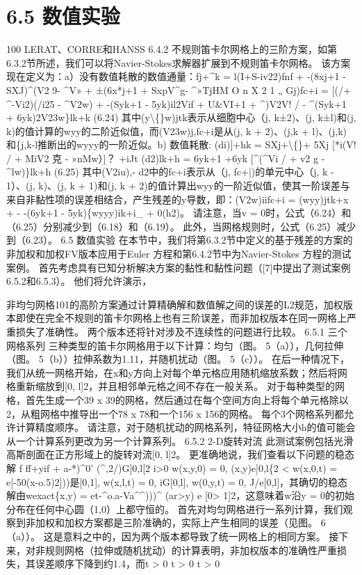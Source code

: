 \documentclass[UTF8,11pt,a4paper,openany,fontset=fandol]{ctexbook}
\begin{document}
\section{6.5 数值实验}
100 LERAT、CORRE和HANSS 6.4.2 不规则笛卡尔网格上的三阶方案，如第6.3.2节所述，我们可以将Navier-Stokes求解器扩展到不规则笛卡尔网格。 该方案现在定义为：a）没有数值耗散的数值通量：fj+\textasciicircum{}k = l(I+S-iv22)fnf + -(8xj+1 - SXJ)\textasciicircum{}(V2 9- \textasciicircum{}V» + ±(6x*j+1 + SxpV\textasciicircum{}g- \textasciicircum{}»TjHM O n X 2 1 „ Gj)fc+i = [(/+ \textasciicircum{}-Vi2)(/i25 - \textasciicircum{}V2w) + -(Syk+1 - 5yk)il2Vif + U\&VI+1 + \textasciicircum{})V2V! / - \textasciicircum{}(Syk+1 + 6yk)2V23w\}lk+k (6.24) 其中(y\textbackslash\{\}w)jtk表示从细胞中心（j, k±2)、(j, k±l)和(j, k)的值计算的wyy的二阶近似值，而(V23w)j,fc+i是从(j, k + 2)、(j,k + l)、(j,k)和\{j,k-l推断出的wyyy的一阶近似。b) 数值耗散: (di)]+hk = SXj+\textbackslash\{\}+ 5Xj [*i(V! / + MiV2 克 - »nMw）]？ +iJt (d2)lk+h = 6yk+1 +6yk [\textasciicircum{}(\textasciicircum{}Vi / + v2 g - \textasciicircum{}lw)\}lk+h (6.25) 其中(V2iu),- d2中的fc+i表示从（j, fc+|)的单元中心（j, k - 1）、(j, k)、(j, k + 1)和(j, k + 2)的值计算出wyy的一阶近似值，使其一阶误差与来自非黏性项的误差相结合，产生残差的y导数，即：(V2w)iifc+i = (wyy)jtk+x + - -(6yk+1 - 5yk)\{wyyy)ik+i\_ + 0(h2)。 请注意，当v = 0时，公式（6.24）和（6.25）分别减少到（6.18）和（6.19）。 此外，当网格规则时，公式（6.25）减少到（6.23）。 6.5 数值实验 在本节中，我们将第6.3.2节中定义的基于残差的方案的非加权和加权FV版本应用于Euler 方程和第6.4.2节中为Navier-Stokes 方程的测试案例。 首先考虑具有已知分析解决方案的黏性和黏性问题（[7]中提出了测试案例6.5.2和6.5.3）。 他们将允许演示，

非均匀网格101的高阶方案通过计算精确解和数值解之间的误差的L2规范，加权版本即使在完全不规则的笛卡尔网格上也有三阶误差，而非加权版本在同一网格上严重损失了准确性。 两个版本还将针对涉及不连续性的问题进行比较。 6.5.1 三个网格系列 三种类型的笛卡尔网格用于以下计算：均匀（图。 5（a）），几何拉伸（图。 5（b））拉伸系数为1.11，并随机扰动（图。 5（c））。 在后一种情况下，我们从统一网格开始，在x和y方向上对每个单元格应用随机缩放系数；然后将网格重新缩放到[0, l]2，并且相邻单元格之间不存在一般关系。 对于每种类型的网格，首先生成一个39 x 39的网格，然后通过在每个空间方向上将每个单元格除以2，从粗网格中推导出一个78 x 78和一个156 x 156的网格。 每个3个网格系列都允许计算精度顺序。 请注意，对于随机扰动的网格系列，特征网格大小h的值可能会从一个计算系列更改为另一个计算系列。 6.5.2 2-D旋转对流 此测试案例包括光滑高斯剖面在正方形域上的旋转对流[0, l]2。 更准确地说，我们查看以下问题的稳态解 f ff+yif + a-*)\textasciicircum{}0' (\textasciicircum{},2/)G]0,l[2 i>0 w(x,y,0) = 0, (x,y)e]0,l\{2 < w(x,0,t) = e[-50(x-o.5)2]))是[0,1], w(x,l,t) = 0, iG[0,l], w(0,y,t) = 0, J/e[0,l]，其确切的稳态解由wexact\{x,y) = et-\textasciicircum{}o.a-Va\textasciicircum{}\textasciicircum{})))\textasciicircum{} (ar>y) e [0> 1]2，这意味着w沿y = 0的初始分布在任何中心圆（1,0）上都守恒的。 首先对均匀网格进行一系列计算，我们观察到非加权和加权方案都是三阶准确的，实际上产生相同的误差（见图。 6（a））。 这是意料之中的，因为两个版本都导致了统一网格上的相同方案。 接下来，对非规则网格（拉伸或随机扰动）的计算表明，非加权版本的准确性严重损失，其误差顺序下降到约1.4，而t > 0 t > 0 t > 0
\end{document}
